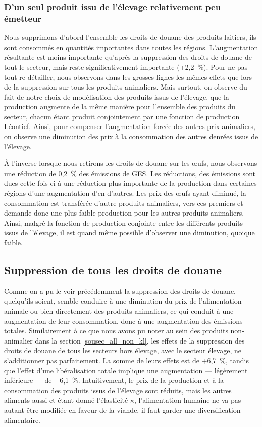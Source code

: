 \subsubsection{D'un seul produit issu de l'élevage relativement peu émetteur}

Nous supprimons d'abord l'ensemble les droits de douane des produits laitiers, ils sont consommés en quantités importantes dans toutes les régions. L'augmentation résultante est moins importante qu'après la suppression des droits de douane de tout le secteur, mais reste significativement importante (+2,2~\%). Pour ne pas tout re-détailler, nous observons dans les grosses lignes les mêmes effets que lors de la suppression sur tous les produits animaliers. Mais surtout, on observe du fait de notre choix de modélisation des produits issus de l'élevage, que la production augmente de la même manière pour l'ensemble des produits du secteur, chacun étant produit conjointement par une fonction de production Léontief. Ainsi, pour compenser l'augmentation forcée des autres prix animaliers, on observe une diminution des prix à la consommation des autres denrées issus de l'élevage.

À l'inverse lorsque nous retirons les droits de douane sur les œufs, nous observons une réduction de 0,2~\% des émissions de GES. Les réductions, des émissions sont dues cette fois-ci à une réduction plus importante de la production dans certaines régions d'une augmentation d'en d'autres. Les prix des œufs ayant diminué, la consommation est transférée d'autre produits animaliers, vers ces premiers et demande donc une plus faible production pour les autres produits animaliers. Ainsi, malgré la fonction de production conjointe entre les différents produits issus de l'élevage, il est quand même possible d'observer une diminution, quoique faible.


\subsection{Suppression de tous les droits de douane}

Comme on a pu le voir précédemment la suppression des droits de douane, quelqu'ils soient, semble conduire à une diminution du prix de l'alimentation animale ou bien directement des produits animaliers, ce qui conduit à une augmentation de leur consommation, donc à une augmentation des émissions totales. Similairement à ce que nous avons pu noter au sein des produits non-animalier dans la section \ref{sousec_all_non_kl}, les effets de la suppression des droits de douane de tous les secteurs hors élevage, avec le secteur élevage, ne s'additionner pas parfaitement. La somme de leurs effets est de +6,7~\%, tandis que l'effet d'une libéralisation totale implique une augmentation — légèrement inférieure — de +6,1~\%. Intuitivement, le prix de la production et à la consommation des produits issus de l'élevage sont réduits, mais les autres aliments aussi et étant donné l'élasticité $\kappa$, l'alimentation humaine ne va pas autant être modifiée en faveur de la viande, il faut garder une diversification alimentaire.


